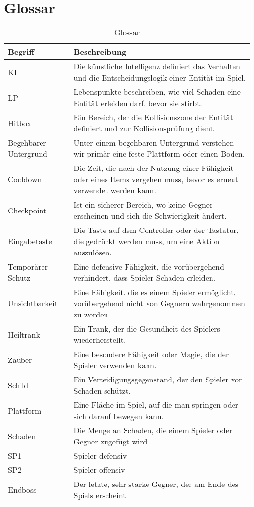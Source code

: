 \documentclass[11pt]{article}
\begin{document}
\section{Glossar}
\begin{table}[htbp]
\centering
\begin{tabular}{ |p{}|p{}| }
\hline
 \textbf{Begriff} & \textbf{Beschreibung} \\
 \hline
 KI & Die künstliche Intelligenz definiert das Verhalten und die Entscheidungslogik einer Entität im Spiel.\\
 \hline
 LP & Lebenspunkte beschreiben, wie viel Schaden eine Entität erleiden darf, bevor sie stirbt.\\
 \hline
 Hitbox & Ein Bereich, der die Kollisionszone der Entität definiert und zur Kollisionsprüfung dient.\\
 \hline
 Begehbarer Untergrund & Unter einem begehbaren Untergrund verstehen wir primär eine feste Plattform oder einen Boden.\\
 \hline
 Cooldown & Die Zeit, die nach der Nutzung einer Fähigkeit oder eines Items vergehen muss, bevor es erneut verwendet werden kann.\\
 \hline
 Checkpoint & Ist ein sicherer Bereich, wo keine Gegner erscheinen und sich die Schwierigkeit ändert.
\\
 \hline
 Eingabetaste & Die Taste auf dem Controller oder der Tastatur, die gedrückt werden muss, um eine Aktion auszulösen.\\
 \hline
 Temporärer Schutz & Eine defensive Fähigkeit, die vorübergehend verhindert, dass Spieler Schaden erleiden.\\
 \hline
 Unsichtbarkeit & Eine Fähigkeit, die es einem Spieler ermöglicht, vorübergehend nicht von Gegnern wahrgenommen zu werden.\\
 \hline
 Heiltrank & Ein Trank, der die Gesundheit des Spielers wiederherstellt. \\
 \hline
 Zauber & Eine besondere Fähigkeit oder Magie, die der Spieler verwenden kann.\\
 \hline
 Schild & Ein Verteidigungsgegenstand, der den Spieler vor Schaden schützt.\\
 \hline
 Plattform & Eine Fläche im Spiel, auf die man springen oder sich darauf bewegen kann. \\
 \hline
 Schaden & Die Menge an Schaden, die einem Spieler oder Gegner zugefügt wird.\\
 \hline
 SP1 & Spieler defensiv\\
 \hline
 SP2 & Spieler offensiv\\
 \hline
  Endboss & Der letzte, sehr starke Gegner, der am Ende des Spiels erscheint.\\
  \hline
\end{tabular}
\caption{Glossar}
\end{table}
\end{document}
